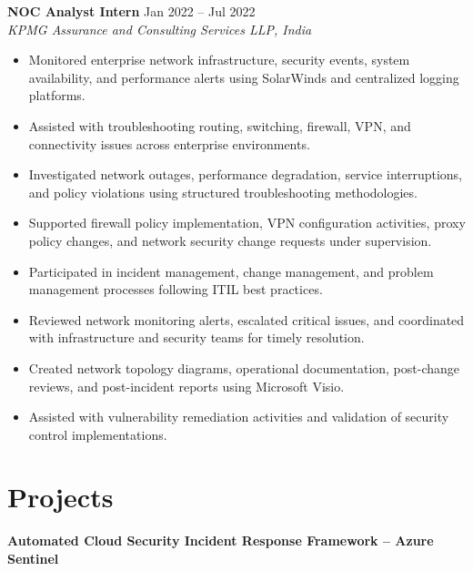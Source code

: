 \documentclass[11pt,a4paper]{article}
\begin{document}
\textbf{NOC Analyst Intern} \hfill Jan 2022 -- Jul 2022\\
\textit{KPMG Assurance and Consulting Services LLP, India}

\begin{itemize}[leftmargin=*]
\item Monitored enterprise network infrastructure, security events, system availability, and performance alerts using SolarWinds and centralized logging platforms.

\item Assisted with troubleshooting routing, switching, firewall, VPN, and connectivity issues across enterprise environments.

\item Investigated network outages, performance degradation, service interruptions, and policy violations using structured troubleshooting methodologies.

\item Supported firewall policy implementation, VPN configuration activities, proxy policy changes, and network security change requests under supervision.

\item Participated in incident management, change management, and problem management processes following ITIL best practices.

\item Reviewed network monitoring alerts, escalated critical issues, and coordinated with infrastructure and security teams for timely resolution.

\item Created network topology diagrams, operational documentation, post-change reviews, and post-incident reports using Microsoft Visio.

\item Assisted with vulnerability remediation activities and validation of security control implementations.
\end{itemize}

\section*{Projects}

\textbf{Automated Cloud Security Incident Response Framework -- Azure Sentinel}
\end{document}
